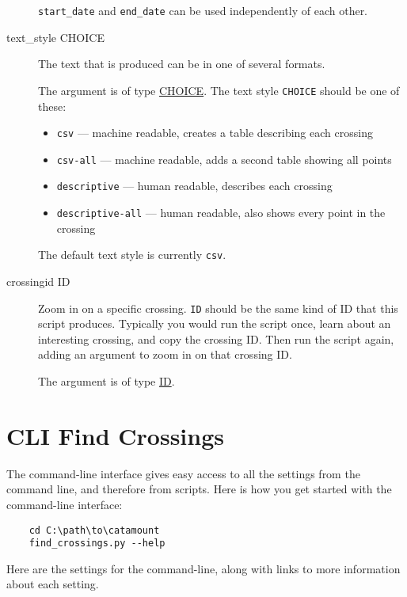 \begin{description}
\texttt{start\_date} and \texttt{end\_date} can be used independently of
each other.

\item[text\_style CHOICE]
\hypertarget{crossing-text-style}{}

The text that is produced can be in one of several formats.

The argument is of type \hyperlink{argument-type-choice}{CHOICE}. The text
style \texttt{CHOICE} should be one of these:

\begin{itemize}
\item \verb=csv= --- machine readable, creates a table describing each crossing
\item \verb=csv-all= --- machine readable, adds a second table showing all points
\item \verb=descriptive= --- human readable, describes each crossing
\item \verb=descriptive-all= --- human readable, also shows every point in the crossing
\end{itemize}

The default text style is currently \texttt{csv}.

\item[crossingid ID]
\hypertarget{crossing-crossingid}{}

Zoom in on a specific crossing. \texttt{ID} should be the same kind of
ID that this script produces. Typically you would run the script once, learn
about an interesting crossing, and copy the crossing ID. Then run the script
again, adding an argument to zoom in on that crossing ID.

The argument is of type \hyperlink{argument-type-id}{ID}.

\end{description}


\section{CLI Find Crossings}

The command-line interface gives easy access to all the settings from the
command line, and therefore from scripts. Here is how you get started with
the command-line interface:

\begin{verbatim}
    cd C:\path\to\catamount
    find_crossings.py --help
\end{verbatim}

Here are the settings for the command-line, along with links to
more information about each setting.

